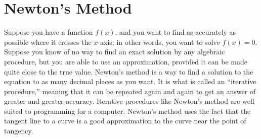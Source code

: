 \section{Newton's Method}{}{}
\nobreak
Suppose you have a function $f(x)$, and you want to find as accurately as
possible where it crosses the $x$-axis; in other words, you want to solve
$f(x)=0$.  Suppose you know of no way to find an exact solution by any
algebraic procedure, but you are able to use an approximation,
provided it can be made quite close to the true value.
Newton's method is a way to find a solution to the
equation to as many decimal places as you want.  It is what is called an
``iterative procedure,'' meaning that it can be repeated again and again to
get an answer of greater and greater accuracy.  Iterative procedures like
Newton's method are well suited to programming for a
computer. Newton's method uses the fact that the tangent line to a
curve is a good approximation to the curve near the point of tangency.

